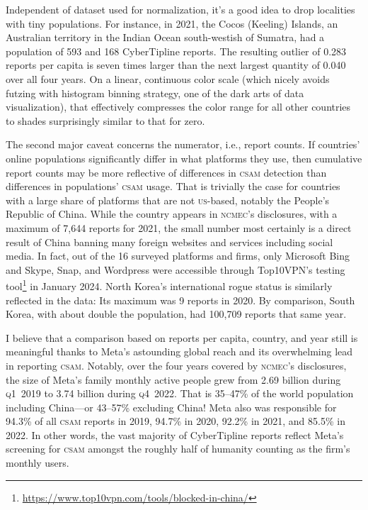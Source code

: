 \documentclass[nonacm,screen]{acmart}
\newcommand\V[1]{\textsc{\MakeLowercase{#1}}}
\begin{document}
Independent of dataset used for normalization, it's a good idea to drop
localities with tiny populations. For instance, in 2021, the Cocos (Keeling)
Islands, an Australian territory in the Indian Ocean south-westish of Sumatra,
had a population of 593 and 168 CyberTipline reports. The resulting outlier of
0.283 reports per capita is seven times larger than the next largest quantity of
0.040 over all four years. On a linear, continuous color scale (which nicely
avoids futzing with histogram binning strategy, one of the dark arts of data
visualization), that effectively compresses the color range for all other
countries to shades surprisingly similar to that for zero.

The second major caveat concerns the numerator, i.e., report counts. If
countries' online populations significantly differ in what platforms they use,
then cumulative report counts may be more reflective of differences in \V{CSAM}
detection than differences in populations' \V{CSAM} usage. That is trivially the
case for countries with a large share of platforms that are not \V{US}-based,
notably the People's Republic of China. While the country appears in \V{NCMEC}'s
disclosures, with a maximum of 7,644 reports for 2021, the small number most
certainly is a direct result of China banning many foreign websites and services
including social media. In fact, out of the 16 surveyed platforms and firms,
only Microsoft Bing and Skype, Snap, and Wordpress were accessible through
Top10VPN's testing
tool\footnote{\url{https://www.top10vpn.com/tools/blocked-in-china/}} in January
2024. North Korea's international rogue status is similarly reflected in the
data: Its maximum was 9 reports in 2020. By comparison, South Korea, with about
double the population, had 100,709 reports that same year.

I believe that a comparison based on reports per capita, country, and year still
is meaningful thanks to Meta's astounding global reach and its overwhelming lead
in reporting \V{CSAM}. Notably, over the four years covered by \V{NCMEC}'s
disclosures, the size of Meta's family monthly active people grew from 2.69
billion during \V{Q1}~2019 to 3.74 billion during \V{Q4}~2022. That is 35--47\%
of the world population including China---or 43--57\% excluding China! Meta also
was responsible for 94.3\% of all \V{CSAM} reports in 2019, 94.7\% in 2020,
92.2\% in 2021, and 85.5\% in 2022. In other words, the vast majority of
CyberTipline reports reflect Meta's screening for \V{CSAM} amongst the roughly
half of humanity counting as the firm's monthly users.
\end{document}
